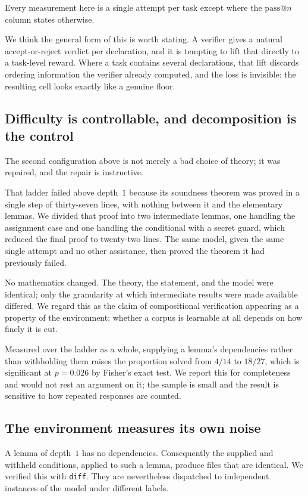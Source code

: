 \documentclass[11pt]{article}
\begin{document}
Every measurement here is a single attempt per task except where the
$\mathrm{pass}@n$ column states otherwise.

We think the general form of this is worth stating. A verifier gives a natural
accept-or-reject verdict per declaration, and it is tempting to lift that
directly to a task-level reward. Where a task contains several declarations, that
lift discards ordering information the verifier already computed, and the loss is
invisible: the resulting cell looks exactly like a genuine floor.

\subsection{Difficulty is controllable, and decomposition is the control}

The second configuration above is not merely a bad choice of theory; it was
repaired, and the repair is instructive.

That ladder failed above depth~$1$ because its soundness theorem was proved in a
single step of thirty-seven lines, with nothing between it and the elementary
lemmas. We divided that proof into two intermediate lemmas, one handling the
assignment case and one handling the conditional with a secret guard, which
reduced the final proof to twenty-two lines. The same model, given the same
single attempt and no other assistance, then proved the theorem it had
previously failed.

No mathematics changed. The theory, the statement, and the model were identical;
only the granularity at which intermediate results were made available differed.
We regard this as the claim of compositional verification appearing as a property
of the environment: whether a corpus is learnable at all depends on how finely it
is cut.

Measured over the ladder as a whole, supplying a lemma's dependencies rather than
withholding them raises the proportion solved from $4/14$ to $18/27$, which is
significant at $p = 0.026$ by Fisher's exact test. We report this for
completeness and would not rest an argument on it; the sample is small and the
result is sensitive to how repeated responses are counted.

\subsection{The environment measures its own noise}

A lemma of depth~$1$ has no dependencies. Consequently the supplied and withheld
conditions, applied to such a lemma, produce files that are identical. We
verified this with \verb|diff|. They are nevertheless dispatched to independent
instances of the model under different labels.
\end{document}
